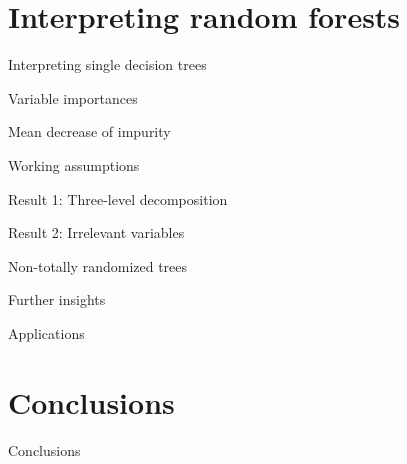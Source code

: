 \documentclass{beamer}
\begin{document}

\section{Interpreting random forests}

\begin{frame}{Interpreting single decision trees}
\end{frame}

\begin{frame}{Variable importances}
\end{frame}

\begin{frame}{Mean decrease of impurity}
\end{frame}

\begin{frame}{Working assumptions}
\end{frame}

\begin{frame}{Result 1: Three-level decomposition}
\end{frame}

\begin{frame}{Result 2: Irrelevant variables}
\end{frame}

\begin{frame}{Non-totally randomized trees}
\end{frame}

\begin{frame}{Further insights}
\end{frame}

\begin{frame}{Applications}
\end{frame}



\section{Conclusions}

\begin{frame}{Conclusions}
\end{frame}
\end{document}
